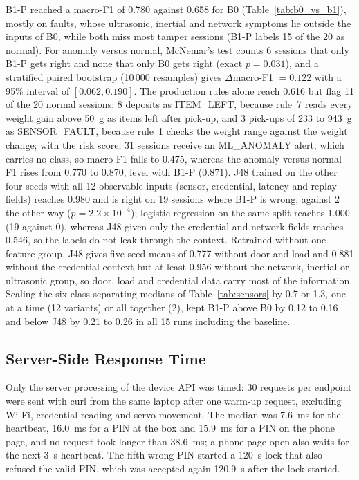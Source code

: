 \documentclass[manuscript,screen]{acmart}
\begin{document}
B1-P reached a macro-F1 of 0.780 against 0.658 for B0 (Table~\ref{tab:b0_vs_b1}), mostly on faults, whose ultrasonic,
inertial and network symptoms lie outside the inputs of B0, while both miss most tamper sessions (B1-P labels 15 of the
20 as normal). For anomaly versus normal, McNemar's test counts 6 sessions that only B1-P gets right and none that only
B0 gets right (exact $p=0.031$), and a stratified paired bootstrap (10\,000 resamples) gives $\Delta$macro-F1 $=0.122$
with a 95\% interval of $[0.062, 0.190]$. The production rules alone reach 0.616 but flag 11 of the 20 normal
sessions: 8 deposits as ITEM\_LEFT, because rule~7 reads every weight gain above 50~g as items left after pick-up, and
3 pick-ups of 233 to 943~g as SENSOR\_FAULT, because rule~1 checks the weight range against the weight change; with the
risk score, 31 sessions
receive an ML\_ANOMALY alert, which carries no class, so macro-F1 falls to 0.475, whereas the anomaly-versus-normal F1
rises from 0.770 to 0.870, level with B1-P (0.871). J48 trained on the other four seeds with all 12 observable
inputs (sensor, credential, latency and replay fields) reaches 0.980 and is right on 19 sessions where B1-P is wrong, against 2 the other way ($p=2.2\times10^{-4}$); logistic
regression on the same split reaches 1.000 (19 against 0), whereas J48 given only the credential and network fields
reaches 0.546, so the labels do not leak through the context. Retrained without one feature group, J48 gives five-seed
means of 0.777 without door and load and 0.881 without the credential context but at least 0.956 without the network, inertial or
ultrasonic group, so door, load and credential data carry most of the information. Scaling the six class-separating
medians of Table~\ref{tab:sensors} by 0.7 or 1.3, one at a time (12 variants) or all together (2), kept B1-P above B0
by 0.12 to 0.16 and below J48 by 0.21 to 0.26 in all 15 runs including the baseline.

\subsection{Server-Side Response Time}\label{sec:latency}

Only the server processing of the device API was timed: 30 requests per endpoint were sent with curl from the same
laptop after one warm-up request, excluding Wi-Fi, credential reading and servo movement. The median was 7.6~ms for the
heartbeat, 16.0~ms for a PIN at the box and 15.9~ms for a PIN on the phone page, and no request took longer than
38.6~ms; a phone-page open also waits for the next 3~s heartbeat. The fifth wrong PIN started a 120~s lock that also
refused the valid PIN, which was accepted again 120.9~s after the lock started.
\end{document}
